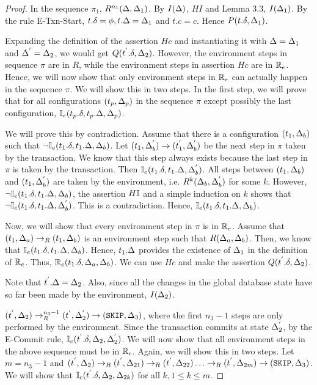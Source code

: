 \documentclass[acmlarge,anonymous]{acmart}\settopmatter{printfolios=true}
\begin{document}
\begin{proof}
In the sequence $\pi_1$, $R^{n_1}(\Delta, \Delta_1)$. By $I(\Delta)$, $HI$ and Lemma 3.3, $I(\Delta_1)$. By the rule E-Txn-Start, $t.\delta = \phi, t.\Delta = \Delta_1$ and $t.c = c$. Hence $P(t.\delta, \Delta_1)$.

Expanding the definition of the assertion $Hc$ and instantiating it with $\Delta = \Delta_1$ and $\Delta^{'} = \Delta_2$, we would get $Q(t^{'}.\delta, \Delta_2)$. However, the environment steps in sequence $\pi$ are in $R$, while the environment steps in assertion $Hc$ are in $\mathbb{R}_e$. Hence, we will now show that only environment steps in $\mathbb{R}_e$ can actually happen in the sequence $\pi$. We will show this in two steps. In the first step, we will prove that for all configurations $(t_p, \Delta_p)$ in the sequence $\pi$ except possibly the last configuration, $\mathbb{I}_e(t_p.\delta, t_p.\Delta, \Delta_p)$. 

We will prove this by contradiction. Assume that there is a configuration $(t_1, \Delta_b)$ such that $\neg \mathbb{I}_e( t_1.\delta, t_1.\Delta, \Delta_b)$. Let $(t_1, \Delta_{b}^{'}) \rightarrow (t_{1}^{'}, \Delta_{b}^{'})$ be the next step in $\pi$ taken by the transaction. We know that this step always exists because the last step in $\pi$ is taken by the transaction.  Then $\mathbb{I}_e(t_1.\delta, t_1.\Delta, \Delta_{b}^{'})$. All steps between $(t_1, \Delta_b)$ and $(t_1, \Delta_{b}^{'})$ are taken by the environment, i.e. $R^{k}(\Delta_b, \Delta_{b}^{'})$ for some $k$. However,  $\neg \mathbb{I}_e(t_1.\delta, t_1.\Delta, \Delta_b)$, the assertion $H\mathbb{I}$ and a simple induction on $k$ shows that $\neg \mathbb{I}_e(t_1.\delta, t_1.\Delta, \Delta_{b}^{'})$. This is a contradiction. Hence, $\mathbb{I}_e(t_1.\delta, t_1.\Delta, \Delta_b)$. 

Now, we will show that every environment step in $\pi$ is in $\mathbb{R}_e$. Assume that $(t_1, \Delta_a) \rightarrow_R (t_1, \Delta_b)$ is an environment step such that $R(\Delta_a, \Delta_b)$. Then, we know that $\mathbb{I}_e(t_1.\delta, t_1.\Delta, \Delta_b)$. Hence, $t_1.\Delta$ provides the existence of $\Delta_1$ in the definition of $\mathbb{R}_e$. Thus, $\mathbb{R}_e(t_1.\delta, \Delta_a, \Delta_b)$. We can use $Hc$ and make the assertion $Q(t^{'}.\delta, \Delta_2)$.

Note that $t^{'}.\Delta = \Delta_2$. Also, since all the changes in the global database state have so far been made by the environment, $I(\Delta_2)$.

$(t^{'}, \Delta_2) \rightarrow_{R}^{n_3 - 1} (t^{'}, \Delta_{2}^{'}) \rightarrow (\texttt{SKIP}, \Delta_3)$, where the first $n_3-1$ steps are only performed by the environment. Since the transaction commits at state $\Delta_{2}^{'}$, by the E-Commit rule, $\mathbb{I}_c(t^{'}.\delta, \Delta_2, \Delta_{2}^{'})$. We will now show that all environment steps in the above sequence must be in $\mathbb{R}_c$. Again, we will show this in two steps. Let $m = n_3 - 1$ and $(t^{'}, \Delta_2) \rightarrow_R (t^{'}, \Delta_{21}) \rightarrow_R (t^{'}, \Delta_{22}) \ldots \rightarrow_R (t^{'}, \Delta_{2m}) \rightarrow (\texttt{SKIP}, \Delta_3)$. We will show that $\mathbb{I}_c(t^{'}.\delta, \Delta_2, \Delta_{2k})$ for all $k, 1 \leq k \leq m$. 


\end{proof}
\end{document}
